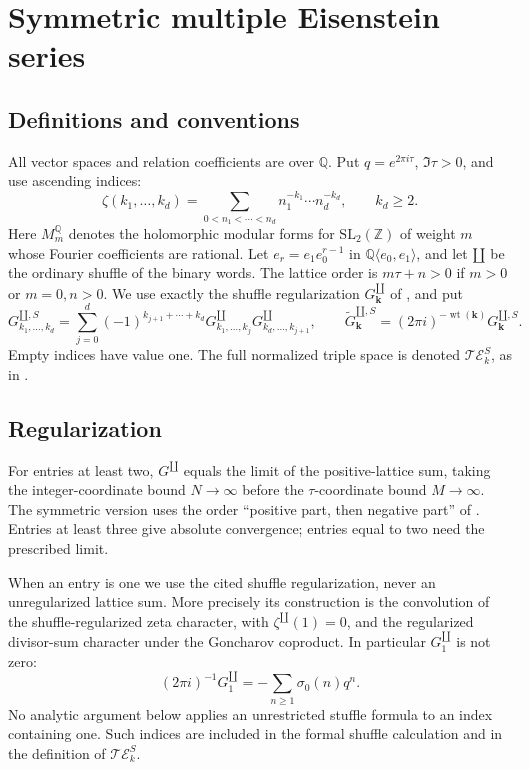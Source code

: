 \documentclass[12pt]{amsart}
\theoremstyle{definition}
\theoremstyle{remark}
\numberwithin{equation}{section}
\newcommand{\Z}{\mathbb{Z}}
\newcommand{\Q}{\mathbb{Q}}
\newcommand{\sh}{\mathbin{\amalg}}
\newcommand{\sG}[1]{\widetilde G^{\sh,S}_{#1}}
\newcommand{\SG}[1]{G^{\sh,S}_{#1}}
\newcommand{\wt}{\operatorname{wt}}
\numberwithin{equation}{section}
\begin{document}
\section{Symmetric multiple Eisenstein series}
\subsection{Definitions and conventions}
All vector spaces and relation coefficients are over $\Q$. Put
$q=e^{2\pi i\tau}$, $\Im\tau>0$, and use ascending indices:
\[
 \zeta(k_1,\ldots,k_d)=\sum_{0<n_1<\cdots<n_d}
             n_1^{-k_1}\cdots n_d^{-k_d},\qquad k_d\ge2.
\]
Here $M_m^{\Q}$ denotes the holomorphic modular forms for
$\mathrm{SL}_2(\Z)$ of weight $m$ whose Fourier coefficients are rational.
Let $e_r=e_1e_0^{r-1}$ in $\Q\langle e_0,e_1\rangle$, and let $\sh$
be the ordinary shuffle of the binary words. The lattice order is
$m\tau+n>0$ if $m>0$ or $m=0,n>0$.
We use exactly the shuffle regularization $G_{\boldsymbol k}^{\sh}$ of
\cite[Theorem 2.7]{hst}, and put
\begin{equation}\label{e:def}
 \SG{k_1,\ldots,k_d}
 =\sum_{j=0}^d(-1)^{k_{j+1}+\cdots+k_d}
   G_{k_1,\ldots,k_j}^{\sh}G_{k_d,\ldots,k_{j+1}}^{\sh},
 \qquad \sG{\boldsymbol k}=(2\pi i)^{-\wt(\boldsymbol k)}\SG{\boldsymbol k}.
\end{equation}
Empty indices have value one. The full normalized triple space is denoted
$\mathcal{TE}_k^S$, as in \cite[\S6.3]{hst}.

\subsection{Regularization}
For entries at least two, $G^{\sh}$ equals the limit of the positive-lattice
sum, taking the integer-coordinate bound $N\to\infty$ before the
$\tau$-coordinate bound $M\to\infty$. The symmetric version uses the order
``positive part, then negative part'' of \cite[Definition 3.6 and
Proposition 3.7]{hst}. Entries at least three give absolute convergence;
entries equal to two need the prescribed limit.

When an entry is one we use the cited shuffle regularization, never an
unregularized lattice sum. More precisely its construction is the convolution
of the shuffle-regularized zeta character, with $\zeta^{\sh}(1)=0$, and
the regularized divisor-sum character under the Goncharov coproduct.
In particular $G^{\sh}_1$ is not zero:
\[
 (2\pi i)^{-1}G^{\sh}_1=-\sum_{n\ge1}\sigma_0(n)q^n.
\]
No analytic argument below applies an unrestricted stuffle formula to an
index containing one. Such indices are included in the formal shuffle
calculation and in the definition of $\mathcal{TE}_k^S$.
\end{document}
